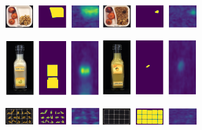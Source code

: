 \begin{figure}[H]
    \captionsetup[subfigure]{justification=centering}
    \centering
    \begin{subfigure}[b]{\textwidth}
        \centering
        \includegraphics[width=0.45\textwidth]{figures/appendix/appendix_simplenet/BB/image_prediction_131.png}
        \includegraphics[width=0.45\textwidth]{figures/appendix/appendix_simplenet/BB/image_prediction_214.png}

    \end{subfigure}
    \begin{subfigure}[b]{\textwidth}
        \centering
        \includegraphics[width=0.45\textwidth]{figures/appendix/appendix_simplenet/JB/image_prediction_165.png}
        \includegraphics[width=0.45\textwidth]{figures/appendix/appendix_simplenet/JB/image_prediction_238.png}

    \end{subfigure}
    \begin{subfigure}[b]{\textwidth}
        \centering
        \includegraphics[width=0.45\textwidth]{figures/appendix/appendix_simplenet/PP/image_prediction_160.png}
        \includegraphics[width=0.45\textwidth]{figures/appendix/appendix_simplenet/PP/image_prediction_195.png}


\end{subfigure}
\end{figure}

